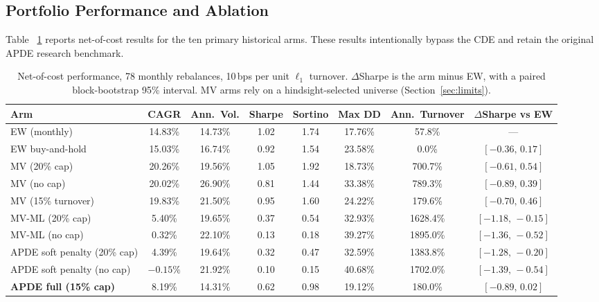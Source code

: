 \documentclass[conference]{IEEEtran}
\begin{document}
\subsection{Portfolio Performance and Ablation}
\label{sec:perf-discuss}
Table~
\ref{tab:perf} reports net-of-cost results for the ten primary
historical arms. These results intentionally bypass the CDE and retain
the original APDE research benchmark.

\begin{table}[t]
\caption{Net-of-cost performance, 78 monthly rebalances, 10\,bps per
unit $\ell_1$ turnover. $\Delta$Sharpe is the arm minus EW, with a
paired block-bootstrap 95\% interval. MV arms rely on a hindsight-selected
universe (Section~\ref{sec:limits}).}
\label{tab:perf}
\centering
\footnotesize
\setlength{\tabcolsep}{3.5pt}
\renewcommand{\arraystretch}{1.15}
\begin{tabular}{@{}lccccccc@{}}
\toprule
\textbf{Arm} & \textbf{CAGR} & \textbf{Ann.\ Vol.} & \textbf{Sharpe} & \textbf{Sortino} & \textbf{Max DD} & \textbf{Ann.\ Turnover} & \textbf{$\Delta$Sharpe vs EW} \\
\midrule
EW (monthly)                  & 14.83\% & 14.73\% & 1.02 & 1.74 & 17.76\% & 57.8\%   & --- \\
EW buy-and-hold               & 15.03\% & 16.74\% & 0.92 & 1.54 & 23.58\% & 0.0\%    & $[-0.36,\,0.17]$ \\
MV (20\% cap)                 & 20.26\% & 19.56\% & 1.05 & 1.92 & 18.73\% & 700.7\%  & $[-0.61,\,0.54]$ \\
MV (no cap)                   & 20.02\% & 26.90\% & 0.81 & 1.44 & 33.38\% & 789.3\%  & $[-0.89,\,0.39]$ \\
MV (15\% turnover)            & 19.83\% & 21.50\% & 0.95 & 1.60 & 24.22\% & 179.6\%  & $[-0.70,\,0.46]$ \\
MV-ML (20\% cap)              & 5.40\%  & 19.65\% & 0.37 & 0.54 & 32.93\% & 1628.4\% & $[-1.18,\,-0.15]$ \\
MV-ML (no cap)                & 0.32\%  & 22.10\% & 0.13 & 0.18 & 39.27\% & 1895.0\% & $[-1.36,\,-0.52]$ \\
APDE soft penalty (20\% cap)  & 4.39\%  & 19.64\% & 0.32 & 0.47 & 32.59\% & 1383.8\% & $[-1.28,\,-0.20]$ \\
APDE soft penalty (no cap)    & $-0.15\%$ & 21.92\% & 0.10 & 0.15 & 40.68\% & 1702.0\% & $[-1.39,\,-0.54]$ \\
\textbf{APDE full (15\% cap)} & 8.19\%  & 14.31\% & 0.62 & 0.98 & 19.12\% & 180.0\%  & $[-0.89,\,0.02]$ \\
\bottomrule
\end{tabular}
\end{table}
\end{document}
